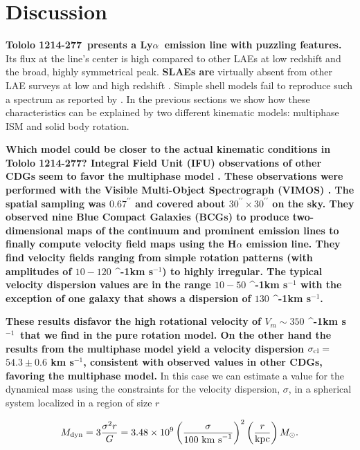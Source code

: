 \documentclass[a4paper,fleqn,usenatbib]{mnras}
\newcommand{\tol}{Tololo 1214-277}
\newcommand{\lya}{\ifmmode{{\rm Ly}\alpha}\else Ly$\alpha$\ \fi}
\newcommand{\kms}{\ifmmode\mathrm{km\ s}^{-1}\else km s$^{-1}$\fi}
\newcommand{\sigmaclump}{$54.3\pm 0.6$ km s$^{-1}$}
\begin{document}
\section{Discussion}

{\bf \tol\ presents a \lya emission line with puzzling features.}
Its flux at the line's center is high compared to other LAEs at low
redshift and the broad, highly symmetrical peak.
{\bf SLAEs are} virtually absent from other LAE surveys at low and high redshift
\citep{2012ApJ...751...29Y,LARS,Erb14,Trainor16}. 
Simple shell models
fail to reproduce such a spectrum as reported by \cite{2015A&A...578A...7V}.  
In the previous sections we show how these characteristics can be
explained by two different kinematic models: multiphase ISM and solid
body rotation.

{\bf Which model could be closer to the actual kinematic conditions in \tol?  
Integral Field Unit (IFU) observations of other CDGs seem to
favor the multiphase model \citep{2015A&A...577A..21C,2017A&A...600A.125C}. 
These observations  were performed with the Visible Multi-Object Spectrograph (VIMOS)
\citep{2003SPIE.4841.1670L}.
The spatial sampling was $0.67^{\prime\prime}$ and covered about
$30^{\prime\prime}\times 30^{\prime\prime}$ on the sky. 
They observed nine Blue Compact Galaxies (BCGs) to produce two-dimensional maps of the
continuum and prominent emission lines to finally compute velocity
field maps using the H$\alpha$ emission line. 
They find velocity fields ranging from simple rotation patterns 
(with amplitudes of $10-120$ \kms) to highly irregular. 
The typical velocity dispersion values are in the range $10-50$ \kms
with the exception of one galaxy that shows a dispersion of $130$
\kms. }

{\bf These results disfavor the high rotational velocity of $V_{m}\sim350$
\kms\  that we find in the pure rotation model. 
On the other hand the results from the multiphase model yield a
velocity dispersion $\sigma_{\rm cl}=$\sigmaclump, consistent with observed
values in other CDGs, favoring the multiphase model.}
In this case we can  estimate a value for the dynamical
mass using the constraints for the velocity dispersion, $\sigma$,  in
a spherical system localized in a region of size $r$    

\begin{equation}
M_{\rm dyn} = 3 \frac{\sigma ^{2}r}{G} = 3.48\times10^{9}
\left(\frac{\sigma}{100\ \mathrm{km\ s}^{-1}}\right)^2\left(\frac{r}{\mathrm{kpc}}\right)
M_{\odot}. 
\end{equation}
\end{document}
